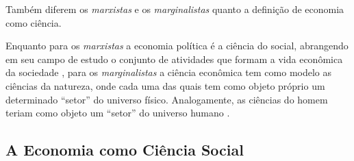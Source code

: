 \documentclass[
	12pt,				%
	oneside,			%
	a4paper,			%
	chapter=TITLE,		%
	section=TITLE,		%
	english,			%
	brazil				%
	]{abntex2}
\begin{document}
Também diferem os \emph{marxistas} e os \emph{marginalistas} quanto a definição de
economia como ciência.

Enquanto para os \emph{marxistas} a economia política é a ciência do social,
abrangendo em seu campo de estudo o conjunto de atividades que formam a vida
econômica da sociedade \autocite[14]{singer}, para os \emph{marginalistas} a
ciência econômica tem como modelo as ciências da natureza, onde cada uma das
quais tem como objeto próprio um determinado ``setor'' do universo físico.
Analogamente, as ciências do homem teriam como objeto um ``setor'' do universo
humano \autocite[15]{singer}.

\hypertarget{a-economia-como-ciuxeancia-social}{%
\subsection{A Economia como Ciência Social}\label{a-economia-como-ciuxeancia-social}}
\end{document}

